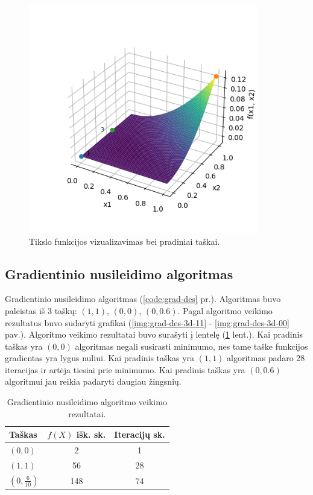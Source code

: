 \documentclass{VUMIFPSkursinis}
\begin{document}
\begin{figure}[H]
  \centering
  \includegraphics[width=10cm]{img/starting_points.png}
  \caption{Tikslo funkcijos vizualizavimas bei pradiniai taškai.}
  \label{img:start-plot}
\end{figure}

\subsection{Gradientinio nusileidimo algoritmas}

Gradientinio nusileidimo algoritmas (\ref{code:grad-des} pr.).
Algoritmas buvo paleistas iš 3 taškų: $(1, 1)$, $(0, 0)$, $(0, 0.6)$.
Pagal algoritmo veikimo rezultatus buvo sudaryti grafikai
(\ref{img:grad-des-3d-11} - \ref{img:grad-des-3d-00} pav.).
Algoritmo veikimo rezultatai buvo surašyti į lentelę (\ref{table:grad-des} lent.).
Kai pradinis taškas yra $(0, 0)$ algoritmas negali susirasti minimumo,
nes tame taške funkcijos gradientas yra lygus nuliui.
Kai pradinis taškas yra $(1, 1)$ algoritmas padaro 28 iteracijas ir artėja tiesiai prie minimumo.
Kai pradinis taškas yra $(0, 0.6)$ algoritmui jau reikia padaryti daugiau žingsnių.

\begin{table}[H]
  \centering
  \caption{Gradientinio nusileidimo algoritmo veikimo rezultatai.}
  \begin{tabular}{l c c}
    \hline\hline
    Taškas                         & $f(X)$ išk. sk. & Iteracijų sk. \\ [0.5ex]
    \hline
    $(0, 0)$                        & 2               & 1             \\
    $(1, 1)$                        & 56              & 28            \\
    $({0}, \frac{6}{10})$           & 148             & 74            \\ [1ex]
    \hline
  \end{tabular}
  \label{table:grad-des}
\end{table}
\end{document}
